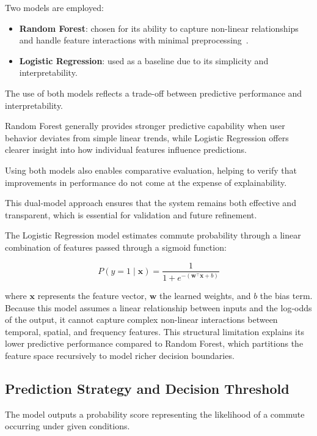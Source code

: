 Two models are employed:

\begin{itemize}
    \item \textbf{Random Forest}: chosen for its ability to capture non-linear relationships and handle feature interactions with minimal preprocessing~\cite{breiman2001random}.
    \item \textbf{Logistic Regression}: used as a baseline due to its simplicity and interpretability.
\end{itemize}

The use of both models reflects a trade-off between predictive performance and interpretability.

Random Forest generally provides stronger predictive capability when user behavior deviates from simple linear trends, while Logistic Regression offers clearer insight into how individual features influence predictions.

Using both models also enables comparative evaluation, helping to verify that improvements in performance do not come at the expense of explainability.

This dual-model approach ensures that the system remains both effective and transparent, which is essential for validation and future refinement.

The Logistic Regression model estimates commute probability through a linear combination of features passed through a sigmoid function:

\begin{equation}
P(y=1 \mid \mathbf{x}) =
\frac{1}{
1 + e^{-(\mathbf{w}^{\top}\mathbf{x}+b)}
}
\end{equation}

where $\mathbf{x}$ represents the feature vector, $\mathbf{w}$ the learned weights, and $b$ the bias term. Because this model assumes a linear relationship between inputs and the log-odds of the output, it cannot capture complex non-linear interactions between temporal, spatial, and frequency features. This structural limitation explains its lower predictive performance compared to Random Forest, which partitions the feature space recursively to model richer decision boundaries.

\subsection{Prediction Strategy and Decision Threshold}

The model outputs a probability score representing the likelihood of a commute occurring under given conditions.

